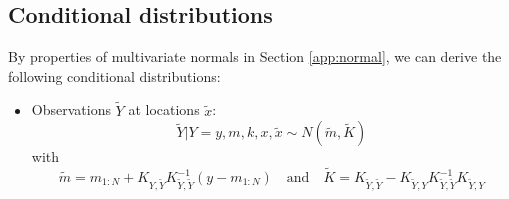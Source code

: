 \documentclass{article}
\newcommand{\1}{\mathbbm{1}}
\begin{document}
\subsection{Conditional distributions}

By properties of multivariate normals in Section \ref{app:normal},
we can derive the following conditional distributions:
\begin{itemize}
\item Observations $\tilde{Y}$ at locations $\tilde{x}$:
\[
\tilde{Y}|Y=y,m,k,x,\tilde{x} \sim N\left(\tilde{m},\tilde{K}\right)
\]
with
\[
\tilde{m} = m_{1:N} + K_{Y,\tilde{Y}}K_{\tilde{Y},\tilde{Y}}^{-1}(y-m_{1:N})
\quad \mbox{and} \quad
\tilde{K} = K_{\tilde{Y},\tilde{Y}} - K_{\tilde{Y},Y}K_{\tilde{Y},\tilde{Y}}^{-1}K_{\tilde{Y},Y}
\]
\end{itemize}



\end{document}
